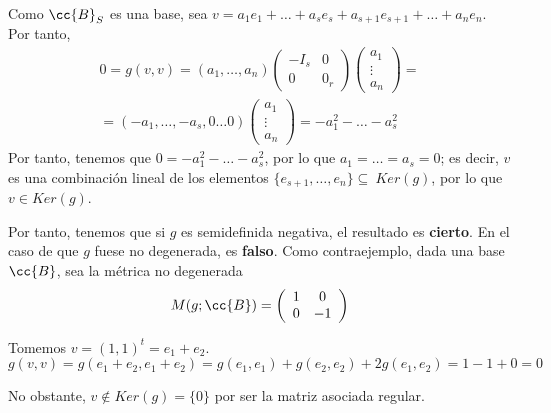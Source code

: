 \begin{ejercicio}
\begin{enumerate}
\begin{description}
            Como $\cc{B}_S$ es una base, sea $v=a_1e_1 + \dots +a_se_s + a_{s+1}e_{s+1} + \dots + a_ne_n$. Por tanto,
            \begin{multline*}
                0=g(v,v)=(a_1,\dots,a_n)\left(\begin{array}{c|c}
                    -I_s & 0 \\ \hline
                    0 & 0_r
                \end{array}\right)
                \left(\begin{array}{c}
                    a_1 \\ \vdots \\ a_n
                \end{array}\right) =\\= (-a_1,\dots, -a_s,0\dots 0)\left(\begin{array}{c}
                    a_1 \\ \vdots \\ a_n
                \end{array}\right)
                = -a_1^2 - \dots -a_s^2
            \end{multline*}
            Por tanto, tenemos que $0=-a_1^2-\dots -a_s^2$, por lo que $a_1=\dots=a_s=0$; es decir, $v$ es una combinación lineal de los elementos $\{e_{s+1},\dots, e_n\}\subseteq~Ker(g)$, por lo que $v\in Ker(g)$.
        \end{description}

        Por tanto, tenemos que si $g$ es semidefinida negativa, el resultado es \textbf{cierto}. En el caso de que $g$ fuese no degenerada, es \textbf{falso}. Como contraejemplo, dada una base $\cc{B}$, sea la métrica no degenerada
        \begin{equation*}
            M(g;\cc{B}) = \left(\begin{array}{cc}
                1 & 0 \\
                0 & -1 \\
            \end{array} \right)
        \end{equation*}
    
        Tomemos $v=(1,1)^t = e_1 + e_2$.
        \begin{equation*}
            g(v,v) = g(e_1+e_2,e_1+e_2) = g(e_1,e_1) + g(e_2,e_2)+2g(e_1,e_2)=1-1+0 = 0
        \end{equation*}
    
        No obstante, $v\notin Ker(g)=\{0\}$ por ser la matriz asociada regular.



\end{enumerate}
\end{ejercicio}
